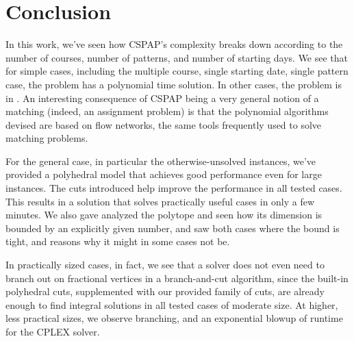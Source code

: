 \chapter{Conclusion}


In this work, we've seen how CSPAP's complexity breaks down according to the number of courses, number of patterns, and number of starting days. We see that for simple cases, including the multiple course, single starting date, single pattern case, the problem has a polynomial time solution. In other cases, the problem is in \npc. An interesting consequence of CSPAP being a very general notion of a matching (indeed, an assignment problem) is that the polynomial algorithms devised are based on flow networks, the same tools frequently used to solve matching problems.

For the general case, in particular the otherwise-unsolved \npc instances, we've provided a polyhedral model that achieves good performance even for large instances. The cuts introduced help improve the performance in all tested cases. This results in a solution that solves practically useful cases in only a few minutes. We also gave analyzed the polytope and seen how its dimension is bounded by an explicitly given number, and saw both cases where the bound is tight, and reasons why it might in some cases not be.

In practically sized cases, in fact, we see that a solver does not even need to branch out on fractional vertices in a branch-and-cut algorithm, since the built-in polyhedral cuts, supplemented with our provided family of cuts, are already enough to find integral solutions in all tested cases of moderate size. At higher, less practical sizes, we observe branching, and an exponential blowup of runtime for the CPLEX solver.

